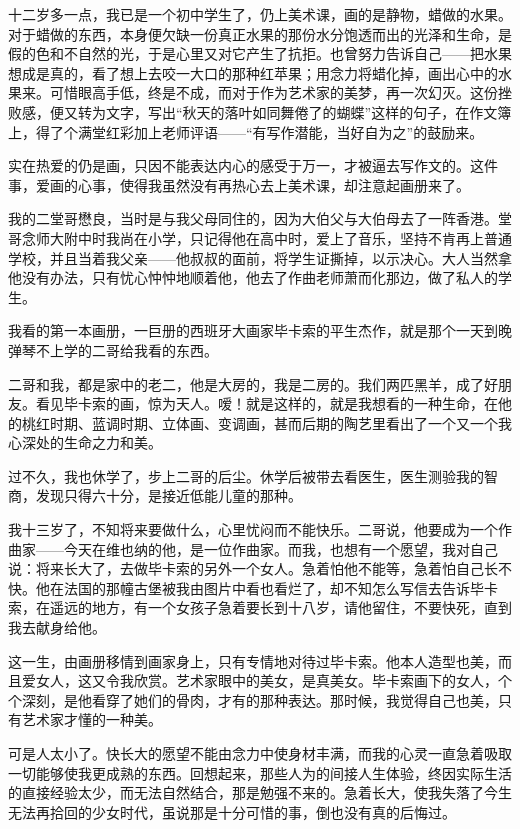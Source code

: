 \par 十二岁多一点，我已是一个初中学生了，仍上美术课，画的是静物，蜡做的水果。对于蜡做的东西，本身便欠缺一份真正水果的那份水分饱透而出的光泽和生命，是假的色和不自然的光，于是心里又对它产生了抗拒。也曾努力告诉自己——把水果想成是真的，看了想上去咬一大口的那种红苹果；用念力将蜡化掉，画出心中的水果来。可惜眼高手低，终是不成，而对于作为艺术家的美梦，再一次幻灭。这份挫败感，便又转为文字，写出“秋天的落叶如同舞倦了的蝴蝶”这样的句子，在作文簿上，得了个满堂红彩加上老师评语——“有写作潜能，当好自为之”的鼓励来。
\par 实在热爱的仍是画，只因不能表达内心的感受于万一，才被逼去写作文的。这件事，爱画的心事，使得我虽然没有再热心去上美术课，却注意起画册来了。
\par 我的二堂哥懋良，当时是与我父母同住的，因为大伯父与大伯母去了一阵香港。堂哥念师大附中时我尚在小学，只记得他在高中时，爱上了音乐，坚持不肯再上普通学校，并且当着我父亲——他叔叔的面前，将学生证撕掉，以示决心。大人当然拿他没有办法，只有忧心忡忡地顺着他，他去了作曲老师萧而化那边，做了私人的学生。
\par 我看的第一本画册，一巨册的西班牙大画家毕卡索的平生杰作，就是那个一天到晚弹琴不上学的二哥给我看的东西。
\par 二哥和我，都是家中的老二，他是大房的，我是二房的。我们两匹黑羊，成了好朋友。看见毕卡索的画，惊为天人。嗳！就是这样的，就是我想看的一种生命，在他的桃红时期、蓝调时期、立体画、变调画，甚而后期的陶艺里看出了一个又一个我心深处的生命之力和美。
\par 过不久，我也休学了，步上二哥的后尘。休学后被带去看医生，医生测验我的智商，发现只得六十分，是接近低能儿童的那种。
\par 我十三岁了，不知将来要做什么，心里忧闷而不能快乐。二哥说，他要成为一个作曲家——今天在维也纳的他，是一位作曲家。而我，也想有一个愿望，我对自己说：将来长大了，去做毕卡索的另外一个女人。急着怕他不能等，急着怕自己长不快。他在法国的那幢古堡被我由图片中看也看烂了，却不知怎么写信去告诉毕卡索，在遥远的地方，有一个女孩子急着要长到十八岁，请他留住，不要快死，直到我去献身给他。
\par 这一生，由画册移情到画家身上，只有专情地对待过毕卡索。他本人造型也美，而且爱女人，这又令我欣赏。艺术家眼中的美女，是真美女。毕卡索画下的女人，个个深刻，是他看穿了她们的骨肉，才有的那种表达。那时候，我觉得自己也美，只有艺术家才懂的一种美。
\par 可是人太小了。快长大的愿望不能由念力中使身材丰满，而我的心灵一直急着吸取一切能够使我更成熟的东西。回想起来，那些人为的间接人生体验，终因实际生活的直接经验太少，而无法自然结合，那是勉强不来的。急着长大，使我失落了今生无法再拾回的少女时代，虽说那是十分可惜的事，倒也没有真的后悔过。
